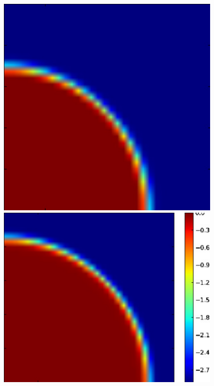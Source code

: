 \begin{figure}[t]
{  \hspace{0.1cm}
  \includegraphics[scale=0.3]{i1-HIIcontour_100myr_nx32.pdf}
  \hspace{0.1cm}
  \includegraphics[scale=0.3]{i1-HIIcontour_500myr_nx32.pdf}
  \hfill}
\vspace{0.2cm}
\centerline{\hfill
}
\end{figure}
